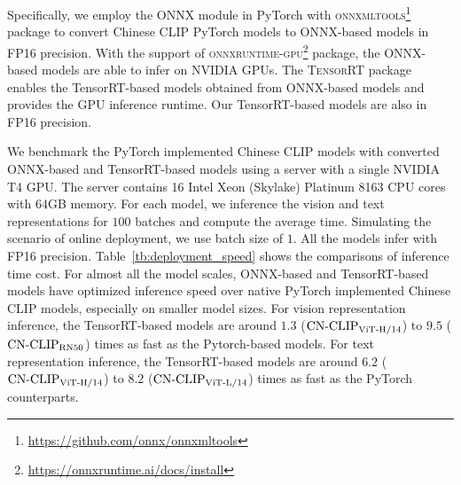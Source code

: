 \documentclass[11pt]{article}
\begin{document}
Specifically, we employ the ONNX module in PyTorch with \textsc{onnxmltools}\footnote{\url{https://github.com/onnx/onnxmltools}} package to convert Chinese CLIP PyTorch models to ONNX-based models in FP16 precision. With the support of \textsc{onnxruntime-gpu}\footnote{\url{https://onnxruntime.ai/docs/install}} package, the ONNX-based models are able to infer on NVIDIA GPUs. The \textsc{TensorRT} package enables the TensorRT-based models obtained from ONNX-based models and provides the GPU inference runtime. Our TensorRT-based models are also in FP16 precision.

We benchmark the PyTorch implemented Chinese CLIP models with converted ONNX-based and TensorRT-based models using a server with a single NVIDIA T4 GPU. The server contains \num{16} Intel Xeon (Skylake) Platinum 8163 CPU cores with \num{64}GB memory. For each model, we inference the vision and text representations for $100$ batches and compute the average time. Simulating the scenario of online deployment, we use batch size of $1$. All the models infer with FP16 precision. Table~\ref{tb:deployment_speed} shows the comparisons of inference time cost. For almost all the model scales, ONNX-based and TensorRT-based models have optimized inference speed over native PyTorch implemented Chinese CLIP models, especially on smaller model sizes. For vision representation inference, the TensorRT-based models are around $1.3$ ($\text{CN-CLIP}\rm_{ViT\text{-}H/14}$) to $9.5$ ($\text{CN-CLIP}\rm_{RN50}$) times as fast as the Pytorch-based models. For text representation inference, the TensorRT-based models are around $6.2$ ($\text{CN-CLIP}\rm_{ViT\text{-}H/14}$) to $8.2$ ($\text{CN-CLIP}\rm_{ViT\text{-}L/14}$) times as fast as the PyTorch counterparts.
\end{document}
